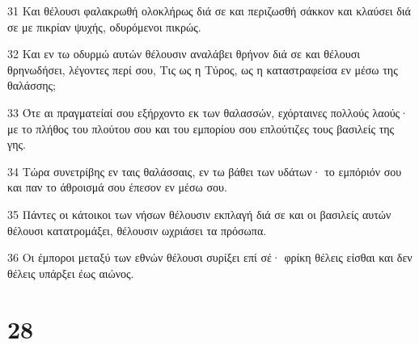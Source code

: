\par 31 Και θέλουσι φαλακρωθή ολοκλήρως διά σε και περιζωσθή σάκκον και κλαύσει διά σε με πικρίαν ψυχής, οδυρόμενοι πικρώς.
\par 32 Και εν τω οδυρμώ αυτών θέλουσιν αναλάβει θρήνον διά σε και θέλουσι θρηνωδήσει, λέγοντες περί σου, Τις ως η Τύρος, ως η καταστραφείσα εν μέσω της θαλάσσης;
\par 33 Ότε αι πραγματείαί σου εξήρχοντο εκ των θαλασσών, εχόρταινες πολλούς λαούς· με το πλήθος του πλούτου σου και του εμπορίου σου επλούτιζες τους βασιλείς της γης.
\par 34 Τώρα συνετρίβης εν ταις θαλάσσαις, εν τω βάθει των υδάτων· το εμπόριόν σου και παν το άθροισμά σου έπεσον εν μέσω σου.
\par 35 Πάντες οι κάτοικοι των νήσων θέλουσιν εκπλαγή διά σε και οι βασιλείς αυτών θέλουσι κατατρομάξει, θέλουσιν ωχριάσει τα πρόσωπα.
\par 36 Οι έμποροι μεταξύ των εθνών θέλουσι συρίξει επί σέ· φρίκη θέλεις είσθαι και δεν θέλεις υπάρξει έως αιώνος.

\chapter{28}

